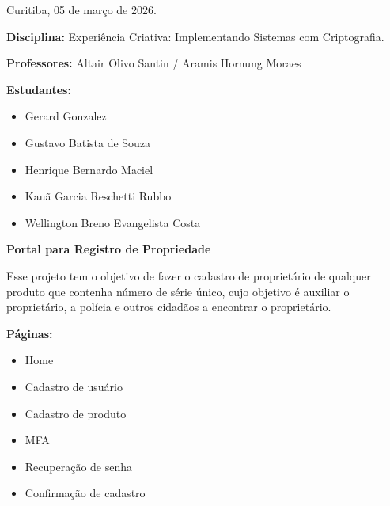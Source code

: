 \documentclass[12pt, a4paper]{article}
\begin{document}
\begin{flushright}
    Curitiba, 05 de março de 2026.
\end{flushright}

\vspace{0.5cm}

\noindent\textbf{Disciplina:} Experiência Criativa: Implementando Sistemas com Criptografia.

\noindent\textbf{Professores:} Altair Olivo Santin / Aramis Hornung Moraes

\vspace{0.3cm}

\noindent\textbf{Estudantes:}

\begin{itemize}[leftmargin=2cm, label={}]
    \item Gerard Gonzalez
    \item Gustavo Batista de Souza
    \item Henrique Bernardo Maciel
    \item Kauã Garcia Reschetti Rubbo
    \item Wellington Breno Evangelista Costa
\end{itemize}

\vspace{0.8cm}

\begin{center}
    \textbf{\large Portal para Registro de Propriedade}
\end{center}

\vspace{0.5cm}

\noindent Esse projeto tem o objetivo de fazer o cadastro de proprietário de qualquer produto que contenha número de série único, cujo objetivo é auxiliar o proprietário, a polícia e outros cidadãos a encontrar o proprietário.

\vspace{0.6cm}

\noindent\textbf{Páginas:}

\begin{itemize}
    \item Home
    \item Cadastro de usuário
    \item Cadastro de produto
    \item MFA
    \item Recuperação de senha
    \item Confirmação de cadastro
\end{itemize}
\end{document}
